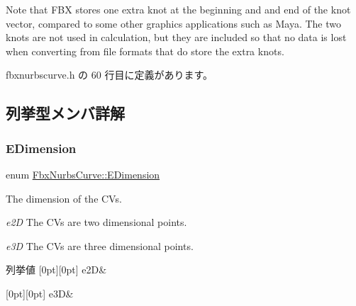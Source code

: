 Note that F\+BX stores one extra knot at the beginning and and end of the knot vector, compared to some other graphics applications such as Maya. The two knots are not used in calculation, but they are included so that no data is lost when converting from file formats that do store the extra knots. 

 fbxnurbscurve.\+h の 60 行目に定義があります。



\subsection{列挙型メンバ詳解}
\mbox{\label{class_fbx_nurbs_curve_a95d4a63cff6dd62901ea39c268336122}} 
\subsubsection{\texorpdfstring{E\+Dimension}{EDimension}}
{\footnotesize\ttfamily enum \hyperlink{class_fbx_nurbs_curve_a95d4a63cff6dd62901ea39c268336122}{Fbx\+Nurbs\+Curve\+::\+E\+Dimension}}

The dimension of the C\+Vs.
\begin{DoxyItemize}
\item {\itshape e2D} The C\+Vs are two dimensional points.
\item {\itshape e3D} The C\+Vs are three dimensional points. 
\end{DoxyItemize}\begin{DoxyEnumFields}{列挙値}
[0pt][0pt]{}\mbox{\label{class_fbx_nurbs_curve_a95d4a63cff6dd62901ea39c268336122aa19c626c6b5212fad0925ae176b55a75}} 
e2D&\\
\hline

[0pt][0pt]{}\mbox{\label{class_fbx_nurbs_curve_a95d4a63cff6dd62901ea39c268336122ae726a5a8f85e1caff03b1dbb7b5c1faf}} 
e3D&\\
\hline

\end{DoxyEnumFields}


